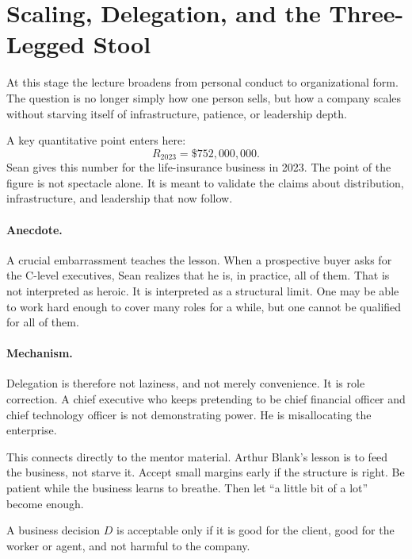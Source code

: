 \section{Scaling, Delegation, and the Three-Legged Stool}

At this stage the lecture broadens from personal conduct to organizational form. The question is no longer simply how one person sells, but how a company scales without starving itself of infrastructure, patience, or leadership depth.

A key quantitative point enters here:
\begin{equation}
R_{2023} = \$752{,}000{,}000.
\end{equation}
Sean gives this number for the life-insurance business in 2023. The point of the figure is not spectacle alone. It is meant to validate the claims about distribution, infrastructure, and leadership that now follow.

\paragraph{Anecdote.}
A crucial embarrassment teaches the lesson. When a prospective buyer asks for the C-level executives, Sean realizes that he is, in practice, all of them. That is not interpreted as heroic. It is interpreted as a structural limit. One may be able to work hard enough to cover many roles for a while, but one cannot be qualified for all of them.

\paragraph{Mechanism.}
Delegation is therefore not laziness, and not merely convenience. It is role correction. A chief executive who keeps pretending to be chief financial officer and chief technology officer is not demonstrating power. He is misallocating the enterprise.

This connects directly to the mentor material. Arthur Blank's lesson is to feed the business, not starve it. Accept small margins early if the structure is right. Be patient while the business learns to breathe. Then let ``a little bit of a lot'' become enough.

\begin{definition}
A business decision \(D\) is acceptable only if it is good for the client, good for the worker or agent, and not harmful to the company.
\end{definition}

